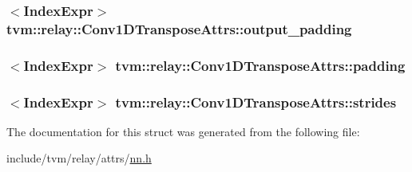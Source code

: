 \subsubsection[{\texorpdfstring{output\+\_\+padding}{output_padding}}]{$<${\bf Index\+Expr}$>$ tvm\+::relay\+::\+Conv1\+D\+Transpose\+Attrs\+::output\+\_\+padding}\hypertarget{structtvm_1_1relay_1_1Conv1DTransposeAttrs_adda59958ed563345a7b55634a2d81131}{}\label{structtvm_1_1relay_1_1Conv1DTransposeAttrs_adda59958ed563345a7b55634a2d81131}
\subsubsection[{\texorpdfstring{padding}{padding}}]{$<${\bf Index\+Expr}$>$ tvm\+::relay\+::\+Conv1\+D\+Transpose\+Attrs\+::padding}\hypertarget{structtvm_1_1relay_1_1Conv1DTransposeAttrs_af9d4b61cdac4dbce71fae171dee77fc2}{}\label{structtvm_1_1relay_1_1Conv1DTransposeAttrs_af9d4b61cdac4dbce71fae171dee77fc2}
\subsubsection[{\texorpdfstring{strides}{strides}}]{$<${\bf Index\+Expr}$>$ tvm\+::relay\+::\+Conv1\+D\+Transpose\+Attrs\+::strides}\hypertarget{structtvm_1_1relay_1_1Conv1DTransposeAttrs_a82403cffafc3e9d4a8f42b7bf3aa6bc7}{}\label{structtvm_1_1relay_1_1Conv1DTransposeAttrs_a82403cffafc3e9d4a8f42b7bf3aa6bc7}


The documentation for this struct was generated from the following file\+:\begin{DoxyCompactItemize}
\item 
include/tvm/relay/attrs/\hyperlink{include_2tvm_2relay_2attrs_2nn_8h}{nn.\+h}\end{DoxyCompactItemize}
